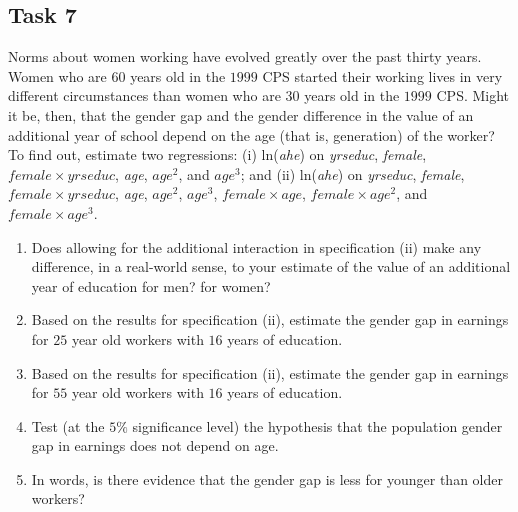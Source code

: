 \documentclass[10pt,a4paper]{amsart}
\begin{document}
\subsection*{Task 7}
Norms about women working have evolved greatly over the past thirty years. Women who are $ 60 $ years old
in the $ 1999 $ CPS started their working lives in very different circumstances than women who are $ 30 $
years old in the $ 1999 $ CPS. Might it be, then, that the gender gap and the gender difference
in the value of an additional year of school depend on the age (that is, generation) of the worker?
To find out, estimate two regressions: (i) ln(\textit{ahe}) on \textit{yrseduc}, \textit{female},
$ female \times yrseduc $, \textit{age}, $ age^{2} $, and $ age^{3} $; and (ii) ln(\textit{ahe})
on \textit{yrseduc}, \textit{female}, $ female \times yrseduc $, \textit{age}, $ age^{2} $, $ age^{3} $,
$ female \times age $, $ female \times age^{2} $, and $ female \times age^{3} $.
\begin{enumerate}
      \item Does allowing for the additional interaction in specification (ii) make any difference, in
            a real-world sense, to your estimate of the value of an additional year of education for men?
            for women?
      \item Based on the results for specification (ii), estimate the gender gap in earnings for $ 25 $
            year old workers with $ 16 $ years of education.
      \item Based on the results for specification (ii), estimate the gender gap in earnings for $ 55 $
            year old workers with $ 16 $ years of education.
      \item Test (at the $ 5\% $ significance level) the hypothesis that the population gender gap
            in earnings does not depend on age.
      \item In words, is there evidence that the gender gap is less for younger than older workers?
\end{enumerate}
\end{document}

